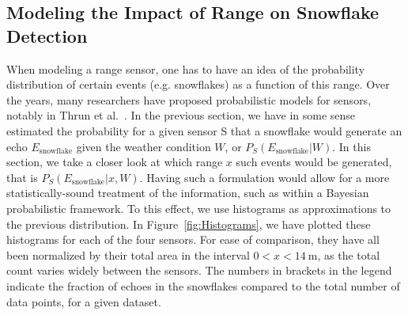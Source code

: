 \subsection{Modeling the Impact of Range on Snowflake Detection}
When modeling a range sensor, one has to have an idea of the probability distribution of certain events (e.g. snowflakes) as a function of this range. Over the years, many researchers have proposed probabilistic models for sensors, notably in Thrun et al.~\cite{Thrun:2005:PR:1121596}. In the previous section, we have in some sense estimated the probability for a given sensor S that a snowflake would generate an echo $E_\text{snowflake}$ given the weather condition $W$, or $P_S(E_\text{snowflake}|W)$. In this section, we take a closer look at which range $x$ such events would be generated, that is $P_S(E_\text{snowflake}|x,W)$. Having such a formulation would allow for a more statistically-sound treatment of the information, such as within a Bayesian probabilistic framework. To this effect, we use histograms as approximations to the previous distribution. In Figure~\ref{fig:Histograms}, we have plotted these histograms for each of the four sensors. For ease of comparison, they have all been normalized by their total area in the interval $0 < x < \SI{14}{\meter}$, as the total count varies widely between the sensors. The numbers in brackets in the legend indicate the fraction of echoes in the snowflakes compared to the total number of data points, for a given dataset.


